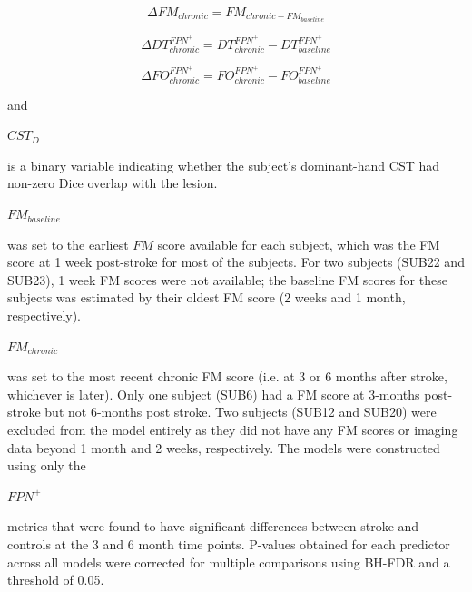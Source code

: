 \documentclass[phd,tocprelim]{cornell}
\begin{document}
	 \begin{Large}
	\begin{center}

	\begin{equation}
	    \Delta FM_{chronic}  = FM_{chronic - FM_{baseline}} 
	\end{equation}

	\begin{equation}
	    \Delta DT^{FPN^+}_{chronic}  = DT^{FPN^+}_{chronic}-DT^{FPN^+}_{baseline} 
	\end{equation}

	\begin{equation}
	    \Delta FO^{FPN^+}_{chronic}  = FO^{FPN^+}_{chronic}-FO^{FPN^+}_{baseline} 
	\end{equation}
	\end{center}
\end{Large}
	and \begin{Large}$CST_D$\end{Large} is a binary variable indicating whether the subject's dominant-hand CST had non-zero Dice overlap with the lesion.  \begin{Large}$FM_{baseline}$\end{Large} was set to the earliest $FM$ score available for each subject, which was the FM score at 1 week post-stroke for most of the subjects. For two subjects (SUB22 and SUB23), 1 week FM scores were not available; the baseline FM scores for these subjects was estimated by their oldest FM score (2 weeks and 1 month, respectively).  \begin{Large}$FM_{chronic}$\end{Large} was set to the most recent chronic FM score (i.e. at 3 or 6 months after stroke, whichever is later). Only one subject (SUB6) had a FM score at 3-months post-stroke but not 6-months post stroke. Two subjects (SUB12 and SUB20) were excluded from the model entirely as they did not have any FM scores or imaging data beyond 1 month and 2 weeks, respectively. The models were constructed using only the \begin{Large}$FPN^+$\end{Large} metrics that were found to have significant differences between stroke and controls at the 3 and 6 month time points. P-values obtained for each predictor across all models were corrected for multiple comparisons using BH-FDR and a threshold of 0.05.
	
\end{document}
